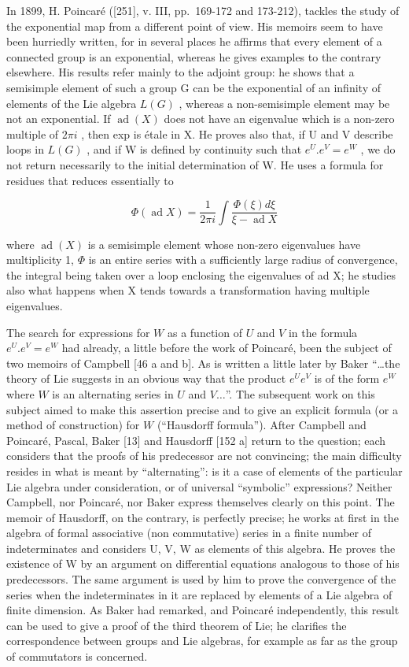 In 1899, H. Poincaré ({[}251{]}, v. III, pp.~169-172 and 173-212), tackles the study of the exponential map from a different point of view. His memoirs seem to have been hurriedly written, for in several places he affirms that every element of a connected group is an exponential, whereas he gives examples to the contrary elsewhere. His results refer mainly to the adjoint group: he shows that a semisimple element of such a group G can be the exponential of an infinity of elements of the Lie algebra \(L(G)\) , whereas a non-semisimple element may be not an exponential. If \(\operatorname{ad}(X)\) does not have an eigenvalue which is a non-zero multiple of \(2\pi i\) , then exp is étale in X. He proves also that, if U and V describe loops in \(L(G)\) , and if W is defined by continuity such that \(e^{U}.e^{V}=e^{W}\) , we do not return necessarily to the initial determination of W. He uses a formula for residues that reduces essentially to

\[
\Phi (\operatorname{ad} X) = \frac {1}{2 \pi i} \int \frac {\Phi (\xi) d \xi}{\xi - \operatorname{ad} X}
\]

where \(\operatorname{ad}(X)\) is a semisimple element whose non-zero eigenvalues have multiplicity 1, \(\Phi\) is an entire series with a sufficiently large radius of convergence, the integral being taken over a loop enclosing the eigenvalues of ad X; he studies also what happens when X tends towards a transformation having multiple eigenvalues.

The search for expressions for \(W\) as a function of \(U\) and \(V\) in the formula \(e^U.e^V = e^W\) had already, a little before the work of Poincaré, been the subject of two memoirs of Campbell {[}46 a and b{]}. As is written a little later by Baker ``\ldots the theory of Lie suggests in an obvious way that the product \(e^Ue^V\) is of the form \(e^W\) where \(W\) is an alternating series in \(U\) and \(V\ldots\)''. The subsequent work on this subject aimed to make this assertion precise and to give an explicit formula (or a method of construction) for \(W\) (``Hausdorff formula''). After Campbell and Poincaré, Pascal, Baker {[}13{]} and Hausdorff {[}152 a{]} return to the question; each considers that the proofs of his predecessor are not convincing; the main difficulty resides in what is meant by ``alternating'': is it a case of elements of the particular Lie algebra under consideration, or of universal ``symbolic'' expressions? Neither Campbell, nor Poincaré, nor Baker express themselves clearly on this point. The memoir of Hausdorff, on the contrary, is perfectly precise; he works at first in the algebra of formal associative (non commutative) series in a finite number of indeterminates and considers U, V, W as elements of this algebra. He proves the existence of W by an argument on differential equations analogous to those of his predecessors. The same argument is used by him to prove the convergence of the series when the indeterminates in it are replaced by elements of a Lie algebra of finite dimension. As Baker had remarked, and Poincaré independently, this result can be used to give a proof of the third theorem of Lie; he clarifies the correspondence between groups and Lie algebras, for example as far as the group of commutators is concerned.

